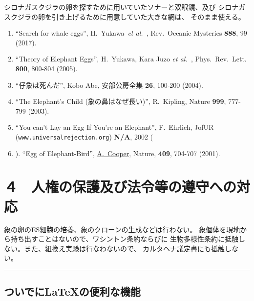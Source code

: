 \documentclass[11pt,a4j,dvipdfmx]{jarticle} 					%
\newcommand{\研究課題名}{象の卵}
\newcommand{\研究機関名}{逢坂大学}
\newcommand{\研究代表者氏名}{湯川秀樹}
\newcommand{\研究期間の最終元号年度}{6}  %
\newcommand{\paper}[6]{%
	\item ``#1'', #2, #3 {\bf #4}, #5 (#6).			%
}
\newcommand{\etal}{\textit{et al.\ }}
\newcommand{\yukawa}{H.~Yukawa}					%
\newcommand{\prl}{Phys.\ Rev.\ Lett.\ }		%
\begin{document}
	シロナガスクジラの卵を探すために用いていたソナーと双眼鏡、及び
	シロナガスクジラの卵を引き上げるために用意していた大きな網は、
	そのまま使える。
	\begin{enumerate}
		\paper{Search for whale eggs}{\yukawa\ \etal}{Rev.\ Oceanic Mysteries}{888}{99}{2017}
			\label{pub:whale}
				
		\paper{Theory of Elephant Eggs}{\yukawa, Kara Juzo \etal}{\prl}{800}{800-804}{2005}
			\label{pub:theoegg}
				
		\paper{仔象は死んだ}{Kobo Abe}{安部公房全集}{26}{100-200}{2004}
		
		\paper{The Elephant's Child (象の鼻はなぜ長い)}{R.~Kipling}{Nature}{999}{777-799}{2003}

		\paper{You can't Lay an Egg If You're an Elephant}{F.~Ehrlich}
			{JofUR\\({\tt www.universalrejection.org})}{{\bf N/A}}{2002}
		
		\item ``Egg of Elephant-Bird'', 
				\underline{A.~Cooper},
				Nature, {\bf 409}, 704-707 (2001).	%
	\end{enumerate}




\section{４　人権の保護及び法令等の遵守への対応}

	象の卵のES細胞の培養、象のクローンの生成などは行わない。
	象個体を現地から持ち出すことはないので、ワシントン条約ならびに
        生物多様性条約に抵触しない。また、組換え実験は行なわないので、
        カルタヘナ議定書にも抵触しない。

        \noindent
        \rule{\linewidth}{1pt}
        \linenumbers
        \subsection{ついでに\LaTeX の便利な機能}
\end{document}
